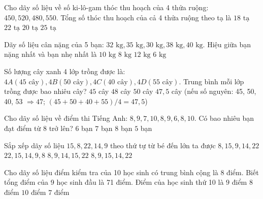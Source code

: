 \begin{ex} %
Cho dãy số liệu về số ki-lô-gam thóc thu hoạch của 4 thửa ruộng: $450, 520, 480, 550$. Tổng số thóc thu hoạch của cả 4 thửa ruộng theo tạ là
\choice
{$18\text{ tạ}$}
{$22\text{ tạ}$}
{\True $20\text{ tạ}$}
{$25\text{ tạ}$}
\end{ex}

\begin{ex} %
Dãy số liệu cân nặng của 5 bạn: $32\text{ kg}, 35\text{ kg}, 30\text{ kg}, 38\text{ kg}, 40\text{ kg}$. Hiệu giữa bạn nặng nhất và bạn nhẹ nhất là
\choice
{\True $10\text{ kg}$}
{$8\text{ kg}$}
{$12\text{ kg}$}
{$6\text{ kg}$}
\end{ex}

\begin{ex} %
Số lượng cây xanh 4 lớp trồng được là: $4A (45\text{ cây}), 4B (50\text{ cây}), 4C (40\text{ cây}), 4D (55\text{ cây})$. Trung bình mỗi lớp trồng được bao nhiêu cây?
\choice
{$45$ cây}
{$48$ cây}
{$50$ cây}
{\True $47{,}5$ cây (nếu số nguyên: 45, 50, 40, 53 $\Rightarrow 47$; $(45+50+40+55)/4 = 47{,}5$)}
\end{ex}

\begin{ex} %
Cho dãy số liệu về điểm thi Tiếng Anh: $8, 9, 7, 10, 8, 9, 6, 8, 10$. Có bao nhiêu bạn đạt điểm từ 8 trở lên?
\choice
{$6$ bạn}
{\True $7$ bạn}
{$8$ bạn}
{$5$ bạn}
\end{ex}

\begin{ex} %
Sắp xếp dãy số liệu $15, 8, 22, 14, 9$ theo thứ tự từ bé đến lớn ta được
\choice
{$8, 15, 9, 14, 22$}
{$22, 15, 14, 9, 8$}
{\True $8, 9, 14, 15, 22$}
{$8, 9, 15, 14, 22$}
\end{ex}

\begin{ex} %
Cho dãy số liệu điểm kiểm tra của 10 học sinh có trung bình cộng là 8 điểm. Biết tổng điểm của 9 học sinh đầu là 71 điểm. Điểm của học sinh thứ 10 là
\choice
{\True $9$ điểm}
{$8$ điểm}
{$10$ điểm}
{$7$ điểm}
\end{ex}

